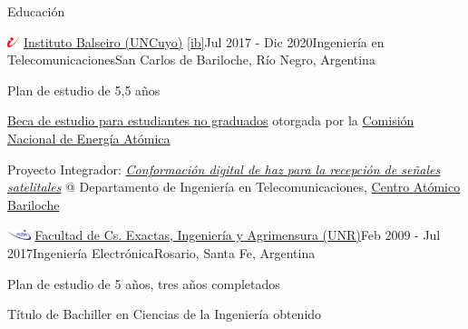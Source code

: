 \documentclass{resume} %
\begin{document}
\clearpage


\begin{rSection}{Educación}

    \begin{rSubsection}{\includegraphics[height=0.3cm]{images/ib-logo.png} \href{https://www.ib.edu.ar/}{Instituto Balseiro (UNCuyo)} \ref{ib}}{Jul 2017 - Dic 2020}{Ingeniería en Telecomunicaciones}{San Carlos de Bariloche, Río Negro, Argentina}
        \item Plan de estudio de 5,5 años
        \item \href{https://www.ib.edu.ar/ingreso-a-carreras/becas.html}{Beca de estudio para estudiantes no graduados} otorgada por la \href{https://www.argentina.gob.ar/cnea}{Comisión Nacional de Energía Atómica}
        \item Proyecto Integrador: \href{https://github.com/grigosback/digital-beamforming}{\textit{Conformación digital de haz para la recepción de señales satelitales}} @ Departamento de Ingeniería en Telecomunicaciones, \href{https://www.argentina.gob.ar/cnea/centros-atomicos/cab}{Centro Atómico Bariloche}
    \end{rSubsection}

    \begin{rSubsection}{\includegraphics[height=0.3cm]{images/fceia.png} \href{https://web.fceia.unr.edu.ar/}{Facultad de Cs. Exactas, Ingeniería y Agrimensura (UNR)}}{Feb 2009 - Jul 2017}{Ingeniería Electrónica}{Rosario, Santa Fe, Argentina}
        \item Plan de estudio de 5 años, tres años completados
        \item Título de Bachiller en Ciencias de la Ingeniería obtenido
    \end{rSubsection}
\end{rSection}

\end{document}
